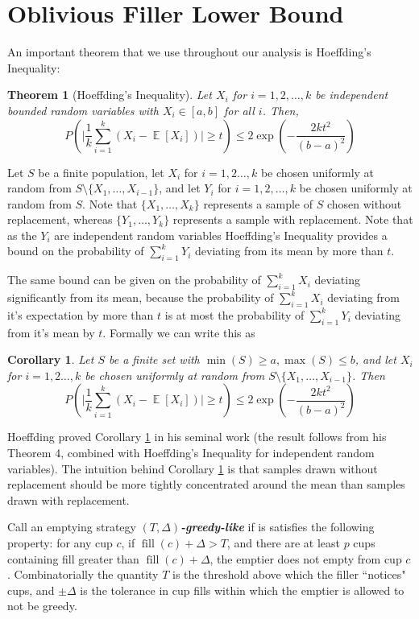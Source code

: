 \documentclass[twocolumn]{article}[10pt]
\newcommand{\defn}[1]{{\textit{\textbf{\boldmath #1}}}\xspace}
\DeclareMathOperator{\E}{\mathbb{E}}
\DeclareMathOperator{\fil}{\text{fill}}
\newtheorem{corollary}{Corollary}
\newtheorem{theorem}{Theorem}
\begin{document}
\section{Oblivious Filler Lower Bound}\label{sec:oblivious}
An important theorem that we use throughout our analysis is Hoeffding's Inequality:
\begin{theorem}[Hoeffding's Inequality]
  Let $X_i$ for $i=1,2,\ldots, k$ be independent bounded random variables with
  $X_i \in [a,b]$ for all $i$. Then,
  $$P\left(\Big|\frac{1}{k} \sum_{i=1}^k (X_i - \E[X_i])\Big|\ge t\right) \le
  2\exp\left(-\frac{2kt^2}{(b-a)^2}\right) $$
\end{theorem}
Let $S$ be a finite population, let $X_i$ for $i=1,2\ldots, k$ be chosen
uniformly at random from $S \setminus \{X_1,\ldots, X_{i-1}\}$, and let $Y_i$
for $i=1,2,\ldots, k$ be chosen uniformly at random from $S$.
Note that $\{X_1,\ldots, X_k\}$ represents a sample of $S$ chosen without
replacement, whereas $\{Y_1,\ldots, Y_k\}$ represents a sample with
replacement. Note that as the $Y_i$ are independent random variables
Hoeffding's Inequality provides a bound on the probability of $\sum_{i=1}^k
Y_i$ deviating from its mean by more than $t$.

The same bound can be given on the probability of $\sum_{i=1}^k X_i$ deviating
significantly from its mean, because the probability of $\sum_{i=1}^k X_i$
deviating from it's expectation by more than $t$ is at most the probability of
$\sum_{i=1}^k Y_i$ deviating from it's mean by $t$.
Formally we can write this as 
\begin{corollary}
  \label{cor:hoeffdingwreplacement}
  Let $S$ be a finite set with $\min(S) \ge a, \max(S) \le b$, and let $X_i$ for $i=1,2\ldots, k$ be chosen
uniformly at random from $S \setminus \{X_1,\ldots, X_{i-1}\}$.
Then 
  $$P\left(\Big|\frac{1}{k} \sum_{i=1}^k (X_i - \E[X_i])\Big|\ge t\right) \le
  2\exp\left(-\frac{2kt^2}{(b-a)^2}\right) $$
\end{corollary}

Hoeffding proved Corollary \ref{cor:hoeffdingwreplacement} in his seminal work
\cite{who62} (the result follows from his Theorem 4, combined with Hoeffding's
Inequality for independent random variables).
The intuition behind Corollary \ref{cor:hoeffdingwreplacement} is that samples
drawn without replacement should be more tightly concentrated around the mean
than samples drawn with replacement.

Call an emptying strategy $(T, \Delta)$\defn{-greedy-like} if is satisfies the
following property: for any cup $c$, if $\fil(c) + \Delta > T$, and there are
at least $p$ cups containing fill greater than $\fil(c) + \Delta$, the emptier
does not empty from cup $c$. Combinatorially the quantity $T$ is the threshold
above which the filler ``notices" cups, and $\pm\Delta$ is the tolerance in cup
fills within which the emptier is allowed to not be greedy.
\end{document}
